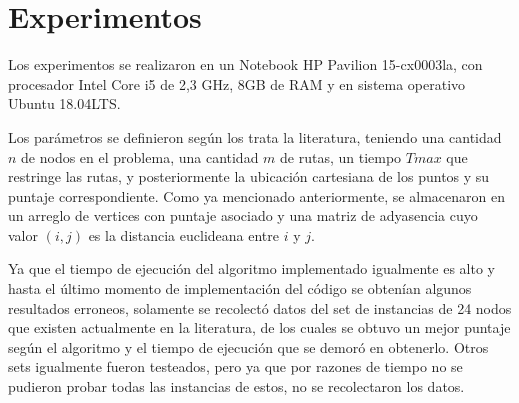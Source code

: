 \section{Experimentos}\label{experiments}
Los experimentos se realizaron en un Notebook HP Pavilion 15-cx0003la, con procesador Intel Core i5 de 2,3 GHz, 8GB de RAM y en sistema operativo Ubuntu 18.04LTS.

Los par\'ametros se definieron seg\'un los trata la literatura, teniendo una cantidad $n$ de nodos en el problema, una cantidad $m$ de rutas, un tiempo $Tmax$ que restringe las rutas, y posteriormente la ubicaci\'on cartesiana de los puntos y su puntaje correspondiente. Como ya mencionado anteriormente, se almacenaron en un arreglo de vertices con puntaje asociado y una matriz de adyasencia cuyo valor $(i,j)$ es la distancia euclideana entre $i$ y $j$.

Ya que el tiempo de ejecuci\'on del algoritmo implementado igualmente es alto y hasta el \'ultimo momento de implementaci\'on del c\'odigo se obten\'ian algunos resultados erroneos, solamente se recolect\'o datos del set de instancias de 24 nodos que existen actualmente en la literatura, de los cuales se obtuvo un mejor puntaje seg\'un el algoritmo y el tiempo de ejecuci\'on que se demor\'o en obtenerlo. Otros sets igualmente fueron testeados, pero ya que por razones de tiempo no se pudieron probar todas las instancias de estos, no se recolectaron los datos.